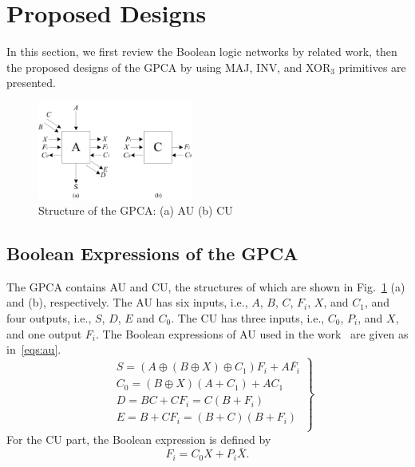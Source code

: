 \documentclass[9pt,journal,compsoc]{IEEEtran}
\begin{document}
   

\section{Proposed Designs}
In this section, we first review the Boolean logic networks by related work, then the proposed designs of the GPCA by using MAJ, INV, and XOR$_3$ primitives are presented.

\begin{figure}[t]
    \centering
    \includegraphics[width=2.0in]{fig/cell.jpg}
    \caption{Structure of the GPCA: (a) AU (b) CU} \label{fig:structure}
\end{figure}

\subsection{Boolean Expressions of the GPCA}
The GPCA contains AU and CU, the structures of which are shown in Fig.~\ref{fig:structure} (a) and (b), respectively.
The AU has six inputs, i.e., $A$, $B$, $C$, $F_{i}$, $X$, and $C_{1}$, and four outputs, i.e., $S$, $D$, $E$ and $C_{0}$.
The CU has three inputs, i.e., $C_{0}$, $P_{i}$, and $X$, and one output $F_{i}$.
The Boolean expressions of AU used in the work~\cite{4} are given as in~\eqref{eqs:au}.
\begin{equation}~\label{eqs:au}
\left.
\begin{split}
& S =(A \oplus (B \oplus X) \oplus C_{1}) F_{i} + A\overline{F_{i}} \\
&C_{0} = (B \oplus X)(A + C_{1}) + AC_{1} \\
&D =BC + CF_{i} = C (B + F_{i})\\    
&E =  B + CF_{i} = (B+C)(B+F_{i})\\
\end{split}\right\}
\end{equation}
For the CU part, the Boolean expression is defined by
\begin{equation}\label{eq:cu}
F_{i} = C_{0}X + P_{i}\bar{X}.
\end{equation}
\end{document}
